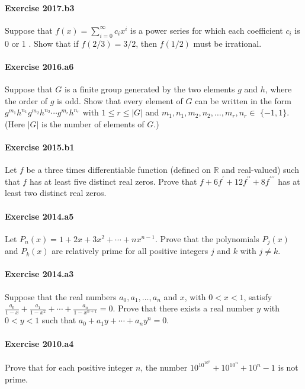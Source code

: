 \documentclass{article}
\begin{document}
\paragraph{Exercise 2017.b3} Suppose that $f(x)=\sum_{i=0}^{\infty} c_{i} x^{i}$ is a power series for which each coefficient $c_{i}$ is 0 or 1 . Show that if $f(2 / 3)=3 / 2$, then $f(1 / 2)$ must be irrational.

\paragraph{Exercise 2016.a6} Suppose that $G$ is a finite group generated by the two elements $g$ and $h$, where the order of $g$ is odd. Show that every element of $G$ can be written in the form $g^{m_1} h^{n_1} g^{m_2} h^{n_2} \cdots g^{m_r} h^{n_r}$ with $1 \leq r \leq|G|$ and $m_1, n_1, m_2, n_2, \ldots, m_r, n_r \in$ $\{-1,1\} .$ (Here $|G|$ is the number of elements of $G$.)

\paragraph{Exercise 2015.b1} Let $f$ be a three times differentiable function (defined on $\mathbb{R}$ and real-valued) such that $f$ has at least five distinct real zeros. Prove that $f+6 f^{\prime}+12 f^{\prime \prime}+8 f^{\prime \prime \prime}$ has at least two distinct real zeros.

\paragraph{Exercise 2014.a5} Let
$P_n(x)=1+2 x+3 x^2+\cdots+n x^{n-1} .$ Prove that the polynomials $P_j(x)$ and $P_k(x)$ are relatively prime for all positive integers $j$ and $k$ with $j \neq k$.

\paragraph{Exercise 2014.a3} Suppose that the real numbers $a_0, a_1, \ldots, a_n$ and $x$, with $0<x<1$, satisfy $\frac{a_0}{1-x}+\frac{a_1}{1-x^2}+\cdots+\frac{a_n}{1-x^{n+1}}=0 .$ Prove that there exists a real number $y$ with $0<y<1$ such that
$a_0+a_1 y+\cdots+a_n y^n=0 .$

\paragraph{Exercise 2010.a4} Prove that for each positive integer $n$, the number $10^{10^{10^n}}+10^{10^n}+10^n-1$ is not prime.
\end{document}

